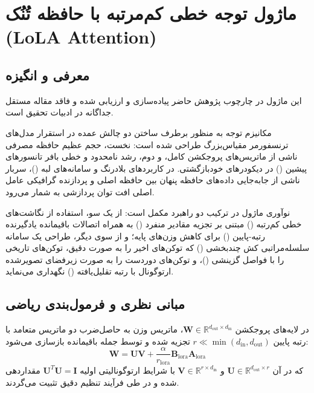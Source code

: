 \section{ماژول توجه خطی کم‌مرتبه با حافظه تُنُک (LoLA Attention)}
\label{sec:module_lola_attention}

\subsection{معرفی و انگیزه}
این ماژول در چارچوب پژوهش حاضر پیاده‌سازی و ارزیابی شده و فاقد مقاله مستقل جداگانه در ادبیات تحقیق است.

مکانیزم توجه  به منظور برطرف ساختن دو چالش عمده در استقرار مدل‌های ترنسفورمر مقیاس‌بزرگ طراحی شده است: نخست، حجم عظیم حافظه مصرفی ناشی از ماتریس‌های پروجکشن کامل، و دوم، رشد نامحدود و خطی بافر تانسورهای پیشین () در دیکودرهای خودبازگشتی. در کاربردهای بلادرنگ و سامانه‌های لبه ()، سربار ناشی از جابه‌جایی داده‌های حافظه پنهان بین حافظه اصلی و پردازنده گرافیکی عامل اصلی افت توان پردازشی به شمار می‌رود.

نوآوری ماژول  در ترکیب دو راهبرد مکمل است: از یک سو، استفاده از نگاشت‌های خطی کم‌رتبه () مبتنی بر تجزیه مقادیر منفرد () به همراه اتصالات باقیمانده یادگیرنده رتبه-پایین () برای کاهش وزن‌های پایه؛ و از سوی دیگر، طراحی یک سامانه سلسله‌مراتبی کش چندبخشی () که توکن‌های اخیر را به صورت دقیق، توکن‌های تاریخی را با فواصل گزینشی ()، و توکن‌های دوردست را به صورت زیرفضای تصویرشده ارتوگونال با رتبه تقلیل‌یافته () نگهداری می‌نماید.

\subsection{مبانی نظری و فرمول‌بندی ریاضی}
در لایه‌های پروجکشن $\mathbf{W} \in \mathbb{R}^{d_{\text{out}} \times d_{\text{in}}}$، ماتریس وزن به حاصل‌ضرب دو ماتریس متعامد با رتبه پایین $r \ll \min(d_{\text{in}}, d_{\text{out}})$ تجزیه شده و توسط جمله باقیمانده  بازسازی می‌شود:
\begin{equation}
\mathbf{W} = \mathbf{U} \mathbf{V} + \frac{\alpha}{r_{\text{lora}}} \mathbf{B}_{\text{lora}} \mathbf{A}_{\text{lora}}
\end{equation}
که در آن $\mathbf{U} \in \mathbb{R}^{d_{\text{out}} \times r}$ و $\mathbf{V} \in \mathbb{R}^{r \times d_{\text{in}}}$ با شرایط ارتوگونالیتی اولیه $\mathbf{U}^T \mathbf{U} = \mathbf{I}$ مقداردهی شده و در طی فرآیند تنظیم دقیق تثبیت می‌گردند.

